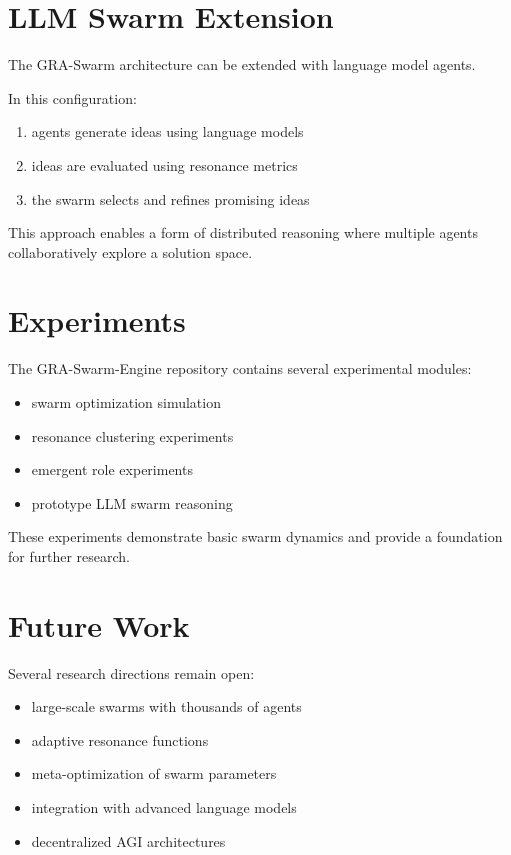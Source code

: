 \documentclass[11pt]{article}
\begin{document}
\section{LLM Swarm Extension}

The GRA-Swarm architecture can be extended with language model agents.

In this configuration:

\begin{enumerate}
\item agents generate ideas using language models
\item ideas are evaluated using resonance metrics
\item the swarm selects and refines promising ideas
\end{enumerate}

This approach enables a form of distributed reasoning where multiple agents collaboratively explore a solution space.

\section{Experiments}

The GRA-Swarm-Engine repository contains several experimental modules:

\begin{itemize}
\item swarm optimization simulation
\item resonance clustering experiments
\item emergent role experiments
\item prototype LLM swarm reasoning
\end{itemize}

These experiments demonstrate basic swarm dynamics and provide a foundation for further research.

\section{Future Work}

Several research directions remain open:

\begin{itemize}
\item large-scale swarms with thousands of agents
\item adaptive resonance functions
\item meta-optimization of swarm parameters
\item integration with advanced language models
\item decentralized AGI architectures
\end{itemize}
\end{document}
